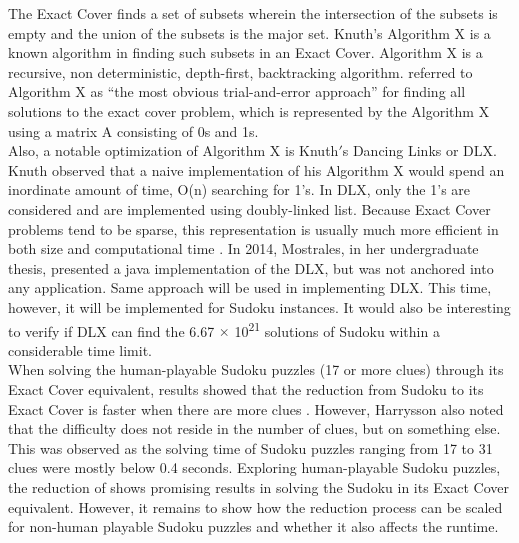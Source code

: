 \documentclass[a4paper,oneside,11pt]{report}
\begin{document}
The Exact Cover finds a set of subsets wherein the intersection of the subsets is empty and the union of the subsets is the major set. Knuth$’$s Algorithm X is a known algorithm in finding such subsets in an Exact Cover. Algorithm X is a recursive, non deterministic, depth-first, backtracking algorithm. \cite{Knuth} referred to Algorithm X as “the most obvious trial-and-error approach” for finding all solutions to the exact cover problem, which is represented by the Algorithm X using  a matrix A consisting of 0s and 1s.\\

Also, a notable optimization of Algorithm X is Knuth$'$s Dancing Links or DLX. Knuth observed that a naive implementation of his Algorithm X would spend an inordinate amount of time, O(n) searching for 1’s. In DLX, only the 1’s are considered and are implemented using doubly-linked list. Because Exact Cover problems tend to be sparse, this representation is usually much more efficient in both size and computational time \cite{Dahlke}. In 2014, Mostrales, in her undergraduate thesis, presented a java implementation of the DLX, but was not anchored into any application. Same approach will be used in implementing DLX. This time, however, it will be implemented for Sudoku instances. It would also be interesting to verify if DLX can find the 6.67 $\times$ 10\textsuperscript{21} solutions of Sudoku within a considerable time limit.\\

When solving the human-playable Sudoku puzzles (17 or more clues) through its Exact Cover equivalent, results showed that the reduction from Sudoku to its Exact Cover is faster when there are more clues \cite{Harrysson}. However, Harrysson also noted that the difficulty does not reside in the number of clues, but on something else. This was observed as the solving time of Sudoku puzzles ranging from 17 to 31 clues were mostly below 0.4 seconds. Exploring human-playable Sudoku puzzles, the reduction of \cite{Harrysson} shows promising results in solving the Sudoku in its Exact Cover equivalent. However, it remains to show how the reduction process can be scaled for non-human playable Sudoku puzzles and whether it also affects the runtime.\\

\begin{figure}[h]
  \centering
  \caption{}
\end{figure}
\end{document}
